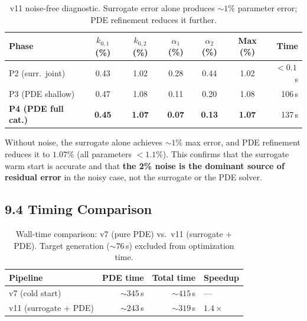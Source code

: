 \documentclass[11pt]{article}
\begin{document}
\begin{table}[H]
  \centering
  \caption{v11 noise-free diagnostic.  Surrogate error alone produces
           ${\sim}1\%$ parameter error; PDE refinement reduces it further.}
  \label{tab:v11_noisefree_ref}
  \begin{tabular}{l S[round-precision=2] S[round-precision=2]
                    S[round-precision=2] S[round-precision=2]
                    S[round-precision=2] r}
    \toprule
    Phase & {$k_{0,1}$ (\%)} & {$k_{0,2}$ (\%)}
          & {$\alpha_1$ (\%)} & {$\alpha_2$ (\%)}
          & {Max (\%)} & {Time} \\
    \midrule
    P2 (surr.\ joint)           & 0.43 & 1.02 & 0.28 & 0.44 & 1.02 & $<0.1$\,s \\
    P3 (PDE shallow)            & 0.47 & 1.08 & 0.11 & 0.20 & 1.08 & 106\,s    \\
    \textbf{P4 (PDE full cat.)} &\textbf{0.45} & \textbf{1.07} & \textbf{0.07} & \textbf{0.13}
                                &\textbf{1.07} & 137\,s    \\
    \bottomrule
  \end{tabular}
\end{table}

Without noise, the surrogate alone achieves ${\sim}1\%$ max error, and PDE
refinement reduces it to $1.07\%$ (all parameters $< 1.1\%$).  This confirms
that the surrogate warm start is accurate and that \textbf{the 2\% noise is the
dominant source of residual error} in the noisy case, not the surrogate or
the PDE solver.

\subsection*{9.4 Timing Comparison}

\begin{table}[H]
  \centering
  \caption{Wall-time comparison: v7 (pure PDE) vs.\ v11 (surrogate + PDE).
           Target generation (${\sim}76$\,s) excluded from optimization time.}
  \label{tab:v11_timing_ref}
  \begin{tabular}{l r r l}
    \toprule
    Pipeline & {PDE time} & {Total time} & Speedup \\
    \midrule
    v7 (cold start)        & ${\sim}345$\,s & ${\sim}415$\,s & --- \\
    v11 (surrogate + PDE)  & ${\sim}243$\,s & ${\sim}319$\,s & $1.4\times$ \\
    \bottomrule
  \end{tabular}
\end{table}
\end{document}
